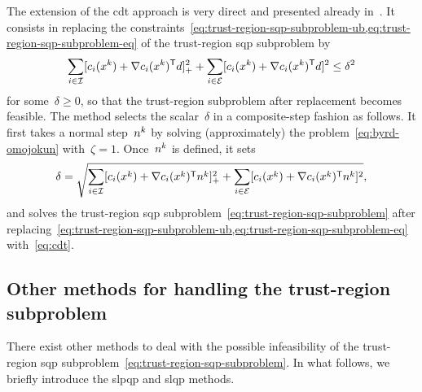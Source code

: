 The extension of the \gls{cdt} approach is very direct and presented already in~\cite[\S~15.4.4]{Conn_Gould_Toint_2000}.
It consists in replacing the constraints~\cref{eq:trust-region-sqp-subproblem-ub,eq:trust-region-sqp-subproblem-eq} of the trust-region \gls{sqp} subproblem by
\begin{equation}
    \label{eq:cdt}
    \sum_{i \in \iub} \posp{\con{i}(\iter[k]) + \nabla \con{i}(\iter[k])^{\T} \step}^2 + \sum_{i \in \ieq} [\con{i}(\iter[k]) + \nabla \con{i}(\iter[k])^{\T} \step]^2 \le \delta^2
\end{equation}
for some~$\delta \ge 0$, so that the trust-region subproblem after replacement becomes feasible.
The method selects the scalar~$\delta$ in a composite-step fashion as follows.
It first takes a normal step~$\nstep[k]$ by solving (approximately) the problem~\cref{eq:byrd-omojokun} with~$\zeta = 1$.
Once~$\nstep[k]$ is defined, it sets
\begin{equation*}
    \delta = \sqrt{\sum_{i \in \iub} \posp{\con{i}(\iter[k]) + \nabla \con{i}(\iter[k])^{\T} \nstep[k]}^2 + \sum_{i \in \ieq} [\con{i}(\iter[k]) + \nabla \con{i}(\iter[k])^{\T} \nstep[k]]^2},
\end{equation*}
and solves the trust-region \gls{sqp} subproblem~\cref{eq:trust-region-sqp-subproblem} after replacing~\cref{eq:trust-region-sqp-subproblem-ub,eq:trust-region-sqp-subproblem-eq} with~\cref{eq:cdt}.

\subsection{Other methods for handling the trust-region  subproblem}

There exist other methods to deal with the possible infeasibility of the trust-region \gls{sqp} subproblem~\cref{eq:trust-region-sqp-subproblem}.
In what follows, we briefly introduce the  \gls{slpqp} and \gls{slqp} methods.


